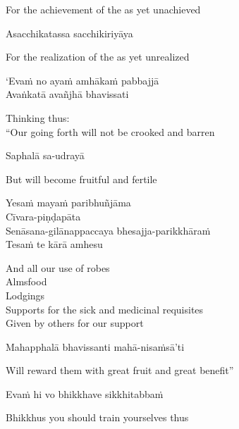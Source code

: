 \begin{cprenglish}
  For the achievement of the as yet unachieved
\end{cprenglish}

Asacchikatassa sacchikiriyāya

\begin{cprenglish}
  For the realization of the as yet unrealized
\end{cprenglish}

‘Evaṁ no ayaṁ amhākaṁ pabbajjā\\
Avaṅkatā avañjhā
bhavissati

\begin{cprenglish}
  Thinking thus:\\
  “Our going forth will not be crooked and barren
\end{cprenglish}

Saphalā sa-udrayā

\begin{cprenglish}
  But will become fruitful and fertile
\end{cprenglish}

Yesaṁ mayaṁ paribhuñjāma\\
Cīvara-piṇḍapāta\\
Senāsana-gilānappaccaya bhesajja-parikkhāraṁ\\
Tesaṁ te kārā amhesu

\begin{cprenglish}
  And all our use of robes\\
  Almsfood\\
  Lodgings\\
  Supports for the sick and medicinal requisites\\
  Given by others for our support
\end{cprenglish}

Mahapphalā bhavissanti mahā-nisaṁsā'ti

\begin{cprenglish}
  Will reward them with great fruit and great benefit”
\end{cprenglish}

Evaṁ hi vo bhikkhave sikkhitabbaṁ

\begin{cprenglish}
  Bhikkhus you should train yourselves thus
\end{cprenglish}

